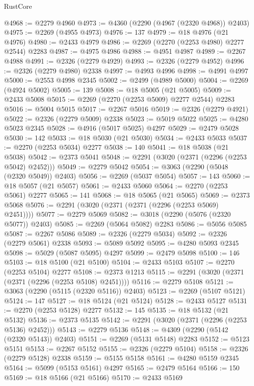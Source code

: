 \begin{lexlean}{RustCore}
\begin{coremodule}
@4968 := @2279 @4960
@4973 := @4360 (@2290 (@4967 (@2320 @4968)) @2403)
@4975 := @2269 (@4955 @4973)
@4976 := 137
@4979 := @18 @4976 (@21 @4976)
@4980 := @2433 @4979
@4986 := @2269 (@2270 (@2253 @4980) @2277 @2544) @2283
@4987 := @4975 @4986
@4988 := @4951 @4987
@4989 := @2267 @4988
@4991 := @2326 (@2279 @4929)
@4993 := @2326 (@2279 @4952)
@4996 := @2326 (@2279 @4980) @2338
@4997 := @4993 @4996
@4998 := @4991 @4997
@5000 := @2553 @4998 @2345
@5002 := @2499 (@4989 @5000)
@5004 := @2269 (@4924 @5002)
@5005 := 139
@5008 := @18 @5005 (@21 @5005)
@5009 := @2433 @5008
@5015 := @2269 (@2270 (@2253 @5009) @2277 @2544) @2283
@5016 := @5004 @5015
@5017 := @2267 @5016
@5019 := @2326 (@2279 @4921)
@5022 := @2326 (@2279 @5009) @2338
@5023 := @5019 @5022
@5025 := @4280 @5023 @2345
@5028 := @4916 (@5017 @5025) @4297
@5029 := @2479 @5028
@5030 := 142
@5033 := @18 @5030 (@21 @5030)
@5034 := @2433 @5033
@5037 := @2270 (@2253 @5034) @2277
@5038 := 140
@5041 := @18 @5038 (@21 @5038)
@5042 := @2373 @5041
@5048 := @2291 (@3020 (@2371 (@2296 (@2253 @5042) @2452)))
@5049 := @2279 @5042
@5054 := @3063 (@2290 (@5048 (@2320 @5049)) @2403)
@5056 := @2269 (@5037 @5054)
@5057 := 143
@5060 := @18 @5057 (@21 @5057)
@5061 := @2433 @5060
@5064 := @2270 (@2253 @5061) @2277
@5065 := 141
@5068 := @18 @5065 (@21 @5065)
@5069 := @2373 @5068
@5076 := @2291 (@3020 (@2371 (@2371 (@2296 (@2253 @5069) @2451))))
@5077 := @2279 @5069
@5082 := @3018 (@2290 (@5076 (@2320 @5077)) @2403)
@5085 := @2269 (@5064 @5082) @2283
@5086 := @5056 @5085
@5087 := @2267 @5086
@5089 := @2326 (@2279 @5034)
@5092 := @2326 (@2279 @5061) @2338
@5093 := @5089 @5092
@5095 := @4280 @5093 @2345
@5098 := @5029 (@5087 @5095) @4297
@5099 := @2479 @5098
@5100 := 146
@5103 := @18 @5100 (@21 @5100)
@5104 := @2433 @5103
@5107 := @2270 (@2253 @5104) @2277
@5108 := @2373 @1213
@5115 := @2291 (@3020 (@2371 (@2371 (@2296 (@2253 @5108) @2451))))
@5116 := @2279 @5108
@5121 := @3063 (@2290 (@5115 (@2320 @5116)) @2403)
@5123 := @2269 (@5107 @5121)
@5124 := 147
@5127 := @18 @5124 (@21 @5124)
@5128 := @2433 @5127
@5131 := @2270 (@2253 @5128) @2277
@5132 := 145
@5135 := @18 @5132 (@21 @5132)
@5136 := @2373 @5135
@5142 := @2291 (@3020 (@2371 (@2296 (@2253 @5136) @2452)))
@5143 := @2279 @5136
@5148 := @4309 (@2290 (@5142 (@2320 @5143)) @2403)
@5151 := @2269 (@5131 @5148) @2283
@5152 := @5123 @5151
@5153 := @2267 @5152
@5155 := @2326 (@2279 @5104)
@5158 := @2326 (@2279 @5128) @2338
@5159 := @5155 @5158
@5161 := @4280 @5159 @2345
@5164 := @5099 (@5153 @5161) @4297
@5165 := @2479 @5164
@5166 := 150
@5169 := @18 @5166 (@21 @5166)
@5170 := @2433 @5169

\end{coremodule}
\end{lexlean}
